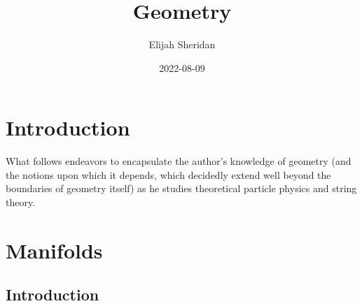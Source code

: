 \documentclass[
]{book}
\title{Geometry}
\author{Elijah Sheridan}
\date{2022-08-09}
\begin{document}
\maketitle

{
\setcounter{tocdepth}{1}
\tableofcontents
}
\hypertarget{intro}{%
\chapter{Introduction}\label{intro}}

What follows endeavors to encapsulate the author's knowledge of geometry (and the notions upon which it depends, which decidedly extend well beyond the boundaries of geometry itself) as he studies theoretical particle physics and string theory.

\hypertarget{manifolds}{%
\chapter{Manifolds}\label{manifolds}}

\hypertarget{introduction}{%
\section{Introduction}\label{introduction}}
\end{document}
